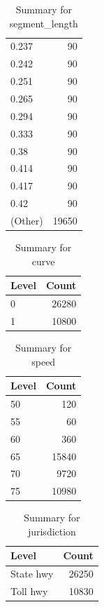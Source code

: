 \begin{table}[ht]
\begin{tabular}{lr}
  0.237 &  90 \\ 
  0.242 &  90 \\ 
  0.251 &  90 \\ 
  0.265 &  90 \\ 
  0.294 &  90 \\ 
  0.333 &  90 \\ 
  0.38 &  90 \\ 
  0.414 &  90 \\ 
  0.417 &  90 \\ 
  0.42 &  90 \\ 
  (Other) & 19650 \\ 
   \hline
\end{tabular}
\caption{Summary for segment_length} 
\label{tab: segment_length}
\end{table}
\begin{table}[ht]
\centering
\begin{tabular}{lr}
  \hline
Level & Count \\ 
  \hline
0 & 26280 \\ 
  1 & 10800 \\ 
   \hline
\end{tabular}
\caption{Summary for curve} 
\label{tab: curve}
\end{table}
\begin{table}[ht]
\centering
\begin{tabular}{lr}
  \hline
Level & Count \\ 
  \hline
50 & 120 \\ 
  55 &  60 \\ 
  60 & 360 \\ 
  65 & 15840 \\ 
  70 & 9720 \\ 
  75 & 10980 \\ 
   \hline
\end{tabular}
\caption{Summary for speed} 
\label{tab: speed}
\end{table}
\begin{table}[ht]
\centering
\begin{tabular}{lr}
  \hline
Level & Count \\ 
  \hline
State hwy & 26250 \\ 
  Toll hwy & 10830 \\ 
   \hline
\end{tabular}
\caption{Summary for jurisdiction} 
\label{tab: jurisdiction}
\end{table}
